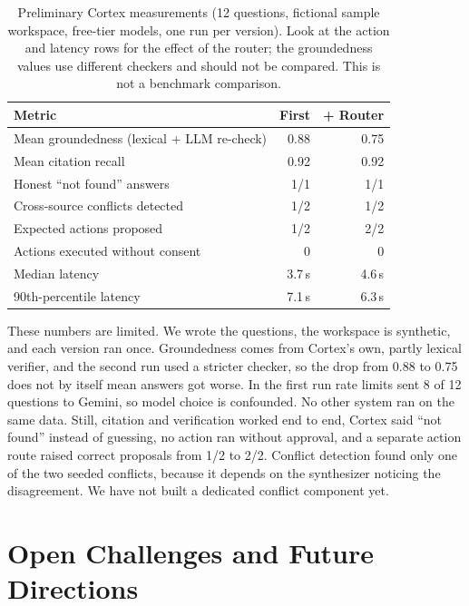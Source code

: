 \documentclass[conference]{IEEEtran}
\begin{document}
\begin{table}[t]
\centering
\caption{Preliminary Cortex measurements (12 questions, fictional sample workspace, free-tier models, one run per version). Look at the action and latency rows for the effect of the router; the groundedness values use different checkers and should not be compared. This is not a benchmark comparison.}
\label{tab:prelim}
\footnotesize
\begin{tabular}{@{}lrr@{}}
\toprule
Metric & First & + Router \\
\midrule
Mean groundedness (lexical + LLM re-check) & 0.88 & 0.75 \\
Mean citation recall & 0.92 & 0.92 \\
Honest ``not found'' answers & 1/1 & 1/1 \\
Cross-source conflicts detected & 1/2 & 1/2 \\
Expected actions proposed & 1/2 & 2/2 \\
Actions executed without consent & 0 & 0 \\
Median latency & 3.7\,s & 4.6\,s \\
90th-percentile latency & 7.1\,s & 6.3\,s \\
\bottomrule
\end{tabular}
\end{table}

These numbers are limited. We wrote the questions, the workspace is synthetic, and each version ran once. Groundedness comes from Cortex's own, partly lexical verifier, and the second run used a stricter checker, so the drop from 0.88 to 0.75 does not by itself mean answers got worse. In the first run rate limits sent 8 of 12 questions to Gemini, so model choice is confounded. No other system ran on the same data. Still, citation and verification worked end to end, Cortex said ``not found'' instead of guessing, no action ran without approval, and a separate action route raised correct proposals from 1/2 to 2/2. Conflict detection found only one of the two seeded conflicts, because it depends on the synthesizer noticing the disagreement. We have not built a dedicated conflict component yet.

\section{Open Challenges and Future Directions}
\label{sec:challenges}
\end{document}
